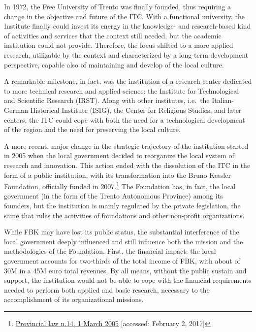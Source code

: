 In 1972, the Free University of Trento was finally founded, thus requiring a change in the objective and future of the ITC. With a functional university, the Institute finally could invest its energy in the knowledge- and research-based kind of activities and services that the context still needed, but the academic institution could not provide. Therefore, the focus shifted to a more applied research, utilizable by the context and characterized by a long-term development perspective, capable also of maintaining and develop of the local culture.

A remarkable milestone, in fact, was the institution of a research center dedicated to more technical research and applied science: the Institute for Technological and Scientific Research (IRST). Along with other institutes, i.e.\ the Italian-German Historical Institute (ISIG), the Center for Religious Studies, and later centers, the ITC could cope with both the need for a technological development of the region and the need for preserving the local culture. 

A more recent, major change in the strategic trajectory of the institution started in 2005 when the local government decided to reorganize the local system of research and innovation. This action ended with the dissolution of the ITC in the form of a public institution, with its transformation into the Bruno Kessler Foundation, officially funded in 2007.\footnote{
	\href{http://www.consiglio.provincia.tn.it/leggi-e-archivi/codice-provinciale/archivio/Pages/Legge\%20provinciale\%202\%20agosto\%202005,\%20n.\%2014_12567.aspx?zid=6003d625-228e-4e5d-820d-d6cf459dfc36}
	{Provincial law n.14, 1 March 2005}
	[accessed: February 2, 2017]
} The Foundation has, in fact, the local government (in the form of the Trento Autonomous Province) among its founders, but the institution is mainly regulated by the private legislation, the same that rules the activities of foundations and other non-profit organizations. 

While FBK may have lost its public status, the substantial interference of the local government deeply influenced and still influence both the mission and the methodologies of the Foundation. First, the financial impact: the local government accounts for two-thirds of the total income of FBK, with about of 30M in a 45M euro total revenues. By all means, without the public sustain and support, the institution would not be able to cope with the financial requirements needed to perform both applied and basic research, necessary to the accomplishment of its organizational missions.

